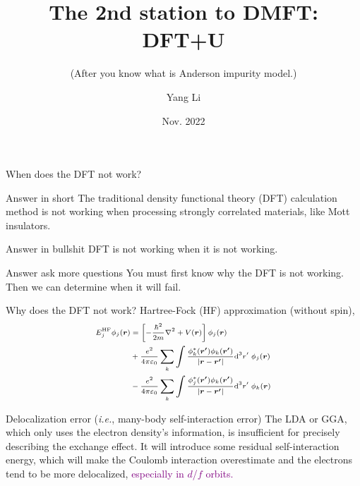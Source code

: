 \documentclass{beamer}
\title{The 2nd station to DMFT: DFT+U}
\subtitle{(After you know what is Anderson impurity model.)}
\author[Yang Li]{
  Yang Li\inst{1}}
\institute[CMT Tsinghua Univ.]{
  \inst{1} Department of Physics\\Tsinghua University 
}
\date[Nov. 2022]{Nov. 2022}
\newcommand{\purple}{\textcolor{purple}}
\begin{document}
  \frame{\titlepage}

  \begin{frame}{When does the DFT not work?}
    \begin{block}{Answer in short}
      The traditional density functional theory (DFT) calculation method is not working when processing strongly correlated materials, like Mott insulators.
    \end{block}

    \begin{block}{Answer in bullshit}
      DFT is not working when it is not working.
    \end{block}

    \begin{block}{Answer ask more questions}
      You must first know why the DFT is not working. Then we can determine when it will fail.
    \end{block}
    
  \end{frame}

  \begin{frame}{Why does the DFT not work?}
    Hartree-Fock (HF) approximation (without spin),
    \begin{equation}\scriptsize
      \begin{aligned}
        E^{\text{HF}}_j\phi_j(\bm{r}) &= \left[-\frac{\hbar^2}{2m}\nabla^2+V(\bm{r})\right]\phi_j(\bm{r}) \\
        &+ \frac{e^2}{4\pi{}\varepsilon_0}\sum_k\int\frac{\phi_k^*(\bm{r'})\phi_k(\bm{r'})}{|\bm{r}-\bm{r'}|}\mathrm{d}^3r'\; \phi_j(\bm{r}) \\
        &- \frac{e^2}{4\pi{}\varepsilon_0}\sum_k\int\frac{\phi_j^*(\bm{r'})\phi_k(\bm{r'})}{|\bm{r}-\bm{r'}|}\mathrm{d}^3r'\; \phi_k(\bm{r})
      \end{aligned}
    \end{equation}
    \begin{block}{Delocalization error (\emph{i.e.}, many-body self-interaction error)}
      The LDA or GGA, which only uses the electron density's information, is insufficient for precisely describing the exchange effect. It will introduce some residual self-interaction energy, which will make the Coulomb interaction overestimate and the electrons tend to be more delocalized, \purple{especially in \(d\)/\(f\) orbits.}
    \end{block}
  \end{frame}
\end{document}
